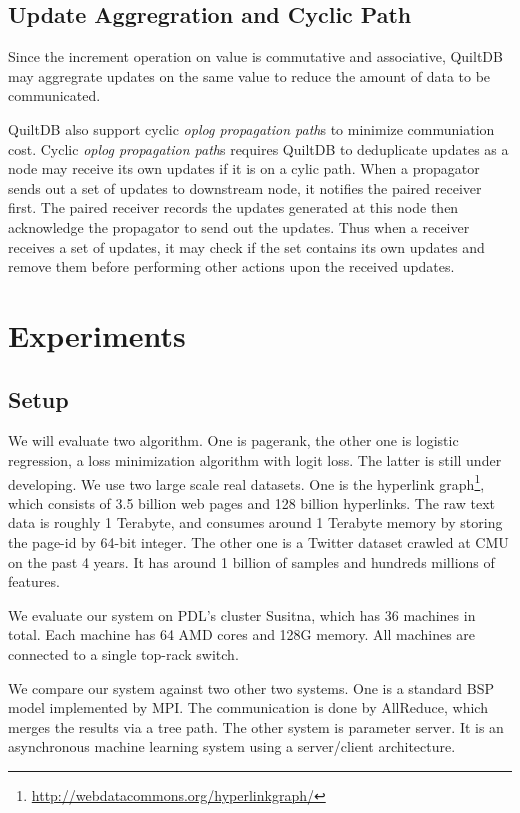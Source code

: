 \documentclass[11pt, twocolumn]{article}
\begin{document}
\subsection{Update Aggregration and Cyclic Path}
\label{sec:update-aggreg}
\label{sec:cyclic-path}

Since the increment operation on value is commutative and associative, QuiltDB
may aggregrate updates on the same value to reduce the amount of data to be
communicated.

QuiltDB also support cyclic \emph{oplog propagation path}s to minimize
communiation cost. Cyclic \emph{oplog propagation path}s requires QuiltDB to
deduplicate updates as a node may receive its own updates if it is on a cylic
path. When a propagator sends out a set of updates to downstream node, it
notifies the paired receiver first. The paired receiver records the updates
generated at this node then acknowledge the propagator to send out the updates.
Thus when a receiver receives a set of updates, it may check if the set contains
its own updates and remove them before performing other actions upon the
received updates.




\section{Experiments}

\subsection{Setup}

We will evaluate two algorithm. One is pagerank, the other one is logistic
regression, a loss minimization algorithm with logit loss. The latter is still
under developing. We use two large scale real datasets. One is the hyperlink
graph\footnote{\url{http://webdatacommons.org/hyperlinkgraph/}}, which consists
of 3.5 billion web pages and 128 billion hyperlinks. The raw text data is
roughly 1 Terabyte, and consumes around 1 Terabyte memory by storing the page-id
by 64-bit integer. The other one is a Twitter dataset crawled at CMU on the past
4 years. It has around 1 billion of samples and hundreds millions of
features.

We evaluate our system on PDL's cluster Susitna, which has 36 machines in
total. Each machine has 64 AMD cores and 128G memory. All machines are connected
to a single top-rack switch.

We compare our system against two other two systems. One is a standard BSP
model implemented by MPI. The communication is done by AllReduce, which merges
the results via a tree path. The other system is parameter server. It is an
asynchronous machine learning system using a server/client architecture.
\end{document}
